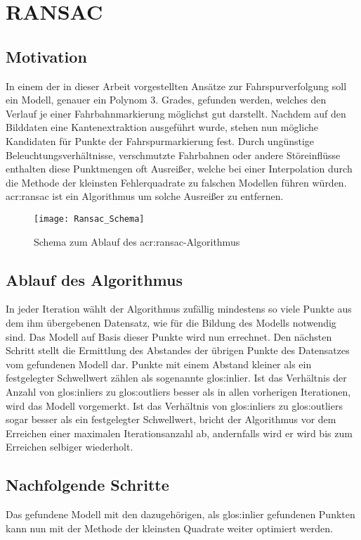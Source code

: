 \section{RANSAC}
\subsection{Motivation}
In einem der in dieser Arbeit vorgestellten Ansätze zur Fahrspurverfolgung soll ein Modell, genauer ein Polynom 3. Grades, gefunden werden, welches den Verlauf je einer Fahrbahnmarkierung möglichst gut darstellt. Nachdem auf den Bilddaten eine Kantenextraktion ausgeführt wurde, stehen nun mögliche Kandidaten für Punkte der Fahrspurmarkierung fest. Durch ungünstige Beleuchtungsverhältnisse, verschmutzte Fahrbahnen oder andere Störeinflüsse enthalten diese Punktmengen oft Ausreißer, welche bei einer Interpolation durch die Methode der kleinsten Fehlerquadrate zu falschen Modellen führen würden. \gls{acr:ransac} \autocite{fischler1981random} ist ein Algorithmus um solche Ausreißer zu entfernen.

\begin{figure}[H]
  \centering
  \texttt{[image: Ransac\_Schema]}
  \caption{Schema zum Ablauf des \gls{acr:ransac}-Algorithmus}
  \label{fig:ransac_scheme}
\end{figure}

\subsection{Ablauf des Algorithmus}
In jeder Iteration wählt der Algorithmus zufällig mindestens so viele Punkte aus dem ihm übergebenen Datensatz, wie für die Bildung des Modells notwendig sind. Das Modell auf Basis dieser Punkte wird nun errechnet. Den nächsten Schritt stellt die Ermittlung des Abstandes der übrigen Punkte des Datensatzes vom gefundenen Modell dar. Punkte mit einem Abstand kleiner als ein festgelegter Schwellwert zählen als sogenannte \gls{glos:inlier}. Ist das Verhältnis der Anzahl von \glspl{glos:inlier} zu \glspl{glos:outlier} besser als in allen vorherigen Iterationen, wird das Modell vorgemerkt. Ist das Verhältnis von \glspl{glos:inlier} zu \glspl{glos:outlier} sogar besser als ein festgelegter Schwellwert, bricht der Algorithmus vor dem Erreichen einer maximalen Iterationsanzahl ab, andernfalls wird er wird bis zum Erreichen selbiger wiederholt.

\subsection{Nachfolgende Schritte}
Das gefundene Modell mit den dazugehörigen, als \gls{glos:inlier} gefundenen Punkten kann nun mit der Methode der kleinsten Quadrate weiter optimiert werden.




